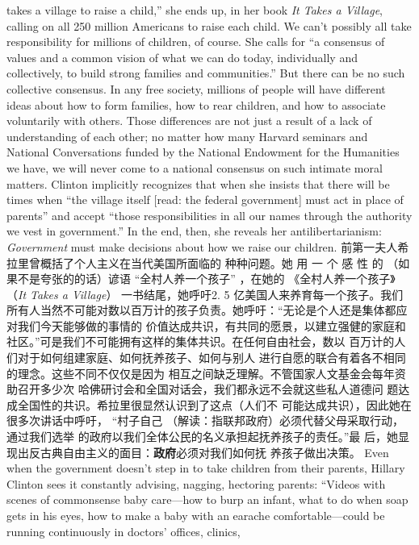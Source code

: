 \begin{paracol}{2}
takes a village to raise a child,'' she ends up, in her book \textit{It Takes
a Village}, calling on all 250 million Americans to raise each
child. We can't possibly all take responsibility for millions of
children, of course. She calls for ``a consensus of values and a
common vision of what we can do today, individually and collectively, to build strong families and communities.'' But there
can be no such collective consensus. In any free society, millions
of people will have different ideas about how to form families,
how to rear children, and how to associate voluntarily with others. Those differences are not just a result of a lack of understanding of each other; no matter how many Harvard seminars
and National Conversations funded by the National Endowment for the Humanities we have, we will never come to a national consensus on such intimate moral matters. Clinton
implicitly recognizes that when she insists that there will be
times when ``the village itself [read: the federal government]
must act in place of parents'' and accept ``those responsibilities
in all our names through the authority we vest in government.''
In the end, then, she reveals her antilibertarianism: \textit{Government}
must make decisions about how we raise our children.
\switchcolumn
前第一夫人希拉里曾概括了个人主义在当代美国所面临的
种种问题。她 用 一 个 感 性 的 （如果不是夸张的的话）谚语
“全村人养一个孩子” ，在她的 《全村人养一个孩子》（\textit{It Takes a Village}） 一书结尾，她呼吁2. 5 亿美国人来养育每一个孩子。我们所有人当然不可能对数以百万计的孩子负责。她呼吁：“无论是个人还是集体都应对我们今天能够做的事情的
价值达成共识，有共同的愿景，以建立强健的家庭和社区。”可是我们不可能拥有这样的集体共识。在任何自由社会，数以
百万计的人们对于如何组建家庭、如何抚养孩子、如何与别人
进行自愿的联合有着各不相同的理念。这些不同不仅仅是因为
相互之间缺乏理解。不管国家人文基金会每年资助召开多少次
哈佛研讨会和全国对话会，我们都永远不会就这些私人道德问
题达成全国性的共识。希拉里很显然认识到了这点（人们不
可能达成共识），因此她在很多次讲话中呼吁， “村子自己
（解读：指联邦政府）必须代替父母采取行动，通过我们选举
的政府以我们全体公民的名义承担起抚养孩子的责任。”最
后，她显现出反古典自由主义的面目：\textbf{政府}必须对我们如何抚
养孩子做出决策。
\switchcolumn*
Even when the government doesn't step in to take children
from their parents, Hillary Clinton sees it constantly advising, nagging, hectoring parents: ``Videos with scenes of commonsense baby care---how to burp an infant, what to do when soap
gets in his eyes, how to make a baby with an earache comfortable---could be running continuously in doctors' offices, clinics,

\end{paracol}
